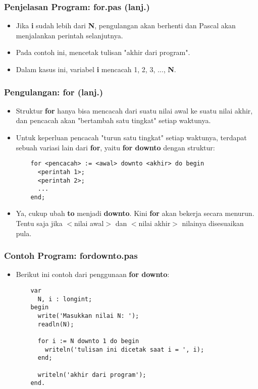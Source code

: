 \documentclass{beamer}
\begin{document}
\begin{frame}
\frametitle{Penjelasan Program: for.pas (lanj.)}
\begin{itemize}
  \item Jika \textbf{i} sudah lebih dari \textbf{N}, pengulangan akan berhenti dan Pascal akan menjalankan perintah selanjutnya.
  \item Pada contoh ini, mencetak tulisan "akhir dari program".
  \item Dalam kasus ini, variabel \textbf{i} mencacah 1, 2, 3, ..., \textbf{N}.
\end{itemize}
\end{frame}

\begin{frame}[fragile]
\frametitle{Pengulangan: for (lanj.)}
\begin{itemize}
  \item Struktur \textbf{for} hanya bisa mencacah dari suatu nilai awal ke suatu nilai akhir, dan pencacah akan "bertambah satu tingkat" setiap waktunya.
  \item Untuk keperluan pencacah "turun satu tingkat" setiap waktunya, terdapat sebuah variasi lain dari \textbf{for}, yaitu \textbf{for downto} dengan struktur:
  \begin{lstlisting}
    for <pencacah> := <awal> downto <akhir> do begin
      <perintah 1>;
      <perintah 2>;
      ...
    end;
  \end{lstlisting}
  \item Ya, cukup ubah \alert{\textbf{to}} menjadi \alert{\textbf{downto}}. Kini \textbf{for} akan bekerja secara menurun. Tentu saja jika $<$nilai awal$>$ dan $<$nilai akhir$>$ nilainya disesuaikan pula.
\end{itemize}
\end{frame}

\begin{frame}[fragile]
\frametitle{Contoh Program: fordownto.pas}
\begin{itemize}
  \item Berikut ini contoh dari penggunaan \textbf{for downto}:
  \begin{lstlisting}
    var
      N, i : longint;
    begin
      write('Masukkan nilai N: ');
      readln(N);

      for i := N downto 1 do begin
        writeln('tulisan ini dicetak saat i = ', i);
      end;

      writeln('akhir dari program');
    end.
  \end{lstlisting}
\end{itemize}
\end{frame}
\end{document}
